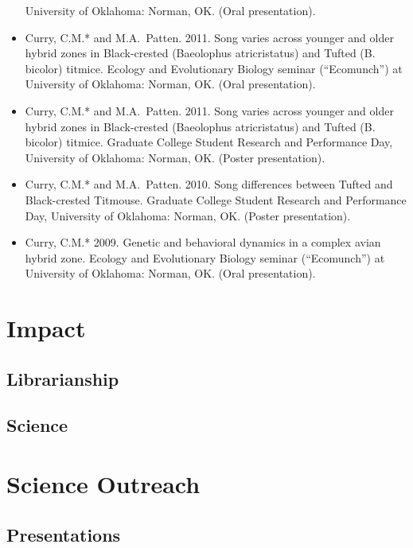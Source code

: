 \documentclass[
  letterpaper,
  DIV=11,
  numbers=noendperiod,
  oneside]{scrreprt}
\begin{document}
\begin{itemize}
  University of Oklahoma: Norman, OK. (Oral presentation).
\item
  Curry, C.M.* and M.A.~Patten. 2011. Song varies across younger and
  older hybrid zones in Black-crested (Baeolophus atricristatus) and
  Tufted (B. bicolor) titmice. Ecology and Evolutionary Biology seminar
  (``Ecomunch'') at University of Oklahoma: Norman, OK. (Oral
  presentation).
\item
  Curry, C.M.* and M.A.~Patten. 2011. Song varies across younger and
  older hybrid zones in Black-crested (Baeolophus atricristatus) and
  Tufted (B. bicolor) titmice. Graduate College Student Research and
  Performance Day, University of Oklahoma: Norman, OK. (Poster
  presentation).
\item
  Curry, C.M.* and M.A.~Patten. 2010. Song differences between Tufted
  and Black-crested Titmouse. Graduate College Student Research and
  Performance Day, University of Oklahoma: Norman, OK. (Poster
  presentation).
\item
  Curry, C.M.* 2009. Genetic and behavioral dynamics in a complex avian
  hybrid zone. Ecology and Evolutionary Biology seminar (``Ecomunch'')
  at University of Oklahoma: Norman, OK. (Oral presentation).
\end{itemize}

\section{Impact}\label{impact}

\subsection{Librarianship}\label{librarianship}

\subsection{Science}\label{science}

\section{Science Outreach}\label{science-outreach}

\subsection{Presentations}\label{presentations}
\end{document}
